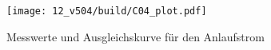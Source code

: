 \begin{figure}
    \centering
    \texttt{[image: 12\_v504/build/C04\_plot.pdf]}
    \caption{Messwerte und Ausgleichskurve für den Anlaufstrom}
    \label{fig:c03}
\end{figure}